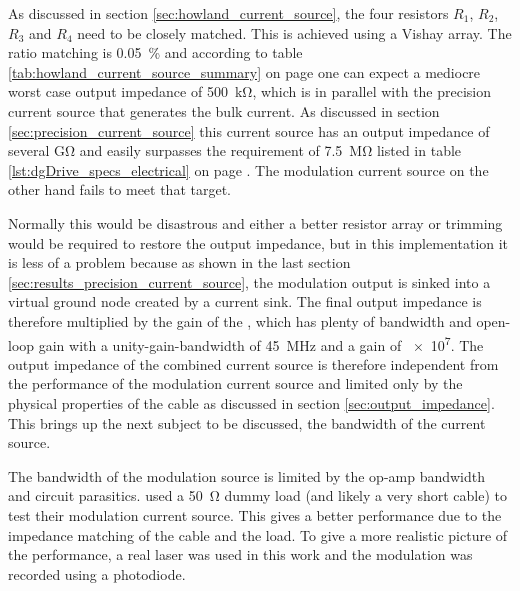 As discussed in section \ref{sec:howland_current_source}, the four resistors $R_1$, $R_2$, $R_3$ and $R_4$ need to be closely matched. This is achieved using a Vishay  \cite{datasheet_MORN} array. The ratio matching is \qty{0.05}{\percent} and according to table \ref{tab:howland_current_source_summary} on page \pageref{tab:howland_current_source_summary} one can expect a mediocre worst case output impedance of \qty{500}{\kilo\ohm}, which is in parallel with the precision current source that generates the bulk current. As discussed in section \ref{sec:precision_current_source} this current source has an output impedance of several \unit{\giga\ohm} and easily surpasses the requirement of \qty{7.5}{\mega\ohm} listed in table \ref{lst:dgDrive_specs_electrical} on page \pageref{lst:dgDrive_specs_electrical}. The modulation current source on the other hand fails to meet that target.

Normally this would be disastrous and either a better resistor array or trimming would be required to restore the output impedance, but in this implementation it is less of a problem because as shown in the last section \ref{sec:results_precision_current_source}, the modulation output is sinked into a virtual ground node created by a current sink. The final output impedance is therefore multiplied by the gain of the , which has plenty of bandwidth and open-loop gain with a unity-gain-bandwidth of \qty{45}{\MHz} and a gain of \num{e7}. The output impedance of the combined current source is therefore independent from the performance of the modulation current source and limited only by the physical properties of the cable as discussed in section \ref{sec:output_impedance}. This brings up the next subject to be discussed, the bandwidth of the current source.

The bandwidth of the modulation source is limited by the op-amp bandwidth and circuit parasitics. \citeauthor{laser_driver_digital} \cite{laser_driver_digital} used a \qty{50}{\ohm} dummy load (and likely a very short cable) to test their modulation current source. This gives a better performance due to the impedance matching of the cable and the load. To give a more realistic picture of the performance, a real laser was used in this work and the modulation was recorded using a photodiode.

